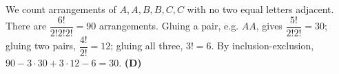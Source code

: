 We count arrangements of $A,A,B,B,C,C$ with no two equal letters adjacent. There are $\dfrac{6!}{2!2!2!}=90$ arrangements. Gluing a pair, e.g. $AA$, gives $\dfrac{5!}{2!2!}=30$; gluing two pairs, $\dfrac{4!}{2!}=12$; gluing all three, $3!=6$. By inclusion-exclusion, $90-3\cdot30+3\cdot12-6=30$. \textbf{(D)}
